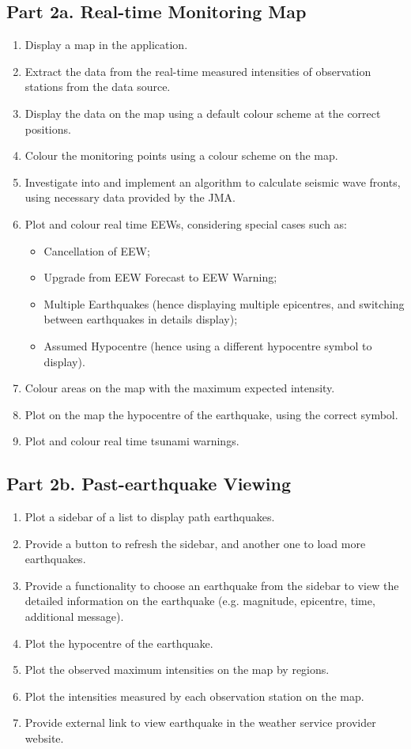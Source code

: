 \subsection{Part 2a. Real-time Monitoring Map}
\begin{enumerate}
    \item Display a map in the application.
    \item Extract the data from the real-time measured intensities of observation stations from the data source.
    \item Display the data on the map using a default colour scheme at the correct positions.
    \item Colour the monitoring points using a colour scheme on the map.
    \item Investigate into and implement an algorithm to calculate seismic wave fronts, using necessary data provided by the JMA.
    \item Plot and colour real time EEWs, considering special cases such as:
          \begin{itemize}
              \item Cancellation of EEW;
              \item Upgrade from EEW Forecast to EEW Warning;
              \item Multiple Earthquakes (hence displaying multiple epicentres, and switching between earthquakes in details display);
              \item Assumed Hypocentre (hence using a different hypocentre symbol to display).
          \end{itemize}
    \item Colour areas on the map with the maximum expected intensity.
    \item Plot on the map the hypocentre of the earthquake, using the correct symbol.
    \item Plot and colour real time tsunami warnings.
\end{enumerate}

\subsection{Part 2b. Past-earthquake Viewing}
\begin{enumerate}
    \item Plot a sidebar of a list to display path earthquakes.
    \item Provide a button to refresh the sidebar, and another one to load more earthquakes.
    \item Provide a functionality to choose an earthquake from the sidebar to view the detailed information on the earthquake (e.g. magnitude, epicentre, time, additional message).
    \item Plot the hypocentre of the earthquake.
    \item Plot the observed maximum intensities on the map by regions.
    \item Plot the intensities measured by each observation station on the map.
    \item Provide external link to view earthquake in the weather service provider website.
\end{enumerate}

